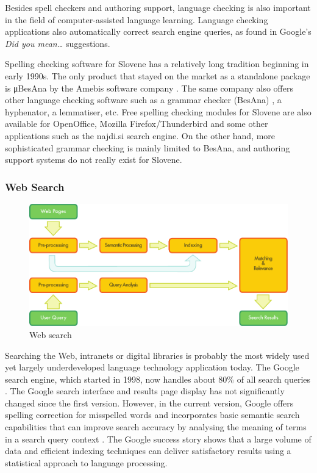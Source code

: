 \begin{multicols}{2}

Besides spell checkers and authoring support, language checking is also important in the field of computer-assisted language learning. Language checking applications also automatically correct search engine queries, as found in Google's \textit{Did you mean…} suggestions.

Spelling checking software for Slovene has a relatively long tradition beginning in early 1990s. The only product that stayed on the market as a standalone package is μBesAna by the Amebis software company \cite{Amb1}. The same company also offers other language checking software such as a grammar checker (BesAna) \cite{Amb2}, a hyphenator, a lemmatiser, etc. Free spelling checking modules for Slovene are also available for OpenOffice, Mozilla Firefox/Thunderbird and some other applications such as the najdi.si search engine. On the other hand, more sophisticated grammar checking is mainly limited to BesAna, and authoring support systems do not really exist for Slovene.

\subsubsection{Web Search}

\begin{figure}[htb]
  \center
  \includegraphics[width=\textwidth]{../_media/english/web_search_architecture}
  \caption{Web search}
\label{fig:websearcharch_en}
 \end{figure}

Searching the Web, intranets or digital libraries is probably the most widely used yet largely underdeveloped language technology application today. The Google search engine, which started in 1998, now handles about 80\% of all search queries \cite{spi1}. The Google search interface and results page display has not significantly changed since the first version. However, in the current version, Google offers spelling correction for misspelled words and incorporates basic semantic search capabilities that can improve search accuracy by analysing the meaning of terms in a search query context \cite{pc1}. The Google success story shows that a large volume of data and efficient indexing techniques can deliver satisfactory results using a statistical approach to language processing. 


\end{multicols}
